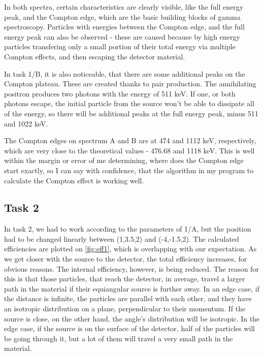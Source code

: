 \documentclass[a4paper,12pt]{article}
\begin{document}
In both spectra, certain characteristics are clearly visible, like the full energy peak, and the Compton edge, which are the basic building blocks of gamma spectroscopy. Particles with  energies between the Compton edge, and the full energy peak can also be observed - these are caused because by high energy particles transfering only a small portion of their total energy via multiple Compton effects, and then escaping the detector material.

In task 1/B, it is also noticeable, that there are some additional peaks on the Compton plateau. These are created thanks to pair production. The annihilating positron produces two photons with the energy of 511 keV. If one, or both photons escape, the initial particle from the source won't be able to dissipate all of the energy, so there will be additional peaks at the full energy peak, minus 511 and 1022 keV.

The Compton edges on spectrum A and B are at 474 and 1112 keV, respectively, which are very close to the theoretical values - 476.68 and 1118 keV. This is well within the margin or error of me determining, where does the Compton edge start exactly, so I can say with confidence, that the algorithm in my program to calculate the Compton effect is working well.

\subsection{Task 2}
In task 2, we had to work according to the parameters of 1/A, but the position had to be changed linearly between (1,3.5,2) and (-4,-1.5,2). The calculated efficiencies are plotted on \autoref{fig:eff1}, which is overlapping with our expectation. As we get closer with the source to the detector, the total efficiency increases, for obvious reasons. The internal efficiency, however, is being reduced. The reason for this is that those particles, that reach the detector, in average, travel a larger path in the material if their equiangular source is further away. In an edge case, if the distance is infinite, the particles are parallel with each other, and they have an isotropic distribution on a plane, perpendicular to their momentum. If the source is close, on the other hand, the angle's distribution will be isotropic. In the edge case, if the source is on the surface of the detector, half of the particles will be going through it, but a lot of them will travel a very small path in the material.
\end{document}

